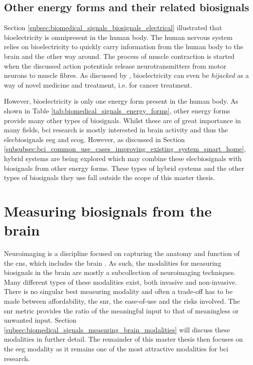 
\subsection{Other energy forms and their related biosignals}
\label{subsec:biomedical_signals_biosignals_others}

Section \ref{subsec:biomedical_signals_biosignals_electrical} illustrated that bioelectricity is omnipresent in the human body. 
The human nervous system relies on bioelectricity to quickly carry information from the human body to the brain and the other way around.
The process of muscle contraction is started when the discussed action potentials release neurotransmitters from motor neurons to muscle fibres.
As discussed by \citet{bioelectricity_cancer}, bioelectricity can even be \textit{hijacked} as a way of novel medicine and treatment, i.e. for cancer treatment.

However, bioelectricity is only one energy form present in the human body.
As shown in Table \ref{tab:biomedical_signals_energy_forms}, other energy forms provide many other types of \glspl{biosignal}.
Whilst these are of great importance in many fields, \gls{bci} research is mostly interested in brain activity and thus the \glspl{elecbiosignal} \gls{eeg} and \gls{ecog}.
However, as discussed in Section \ref{subsubsec:bci_common_use_cases_improving_existing_system_smart_home}, hybrid systems are being explored which may combine these \glspl{elecbiosignal} with \glspl{biosignal} from other energy forms.
These types of hybrid systems and the other types of \glspl{biosignal} they use fall outside the scope of this master thesis.


\section{Measuring biosignals from the brain}
\label{sec:biomedical_signals_measuring_brain}

Neuroimaging is a discipline focused on capturing the anatomy and function of the \gls{cns}, which includes the brain \citep{neuroimaging}.
As such, the modalities for measuring biosignals in the brain are mostly a subcollection of neuroimaging techniques.
Many different types of these modalities exist, both invasive and non-invasive.
There is no singular best measuring modality and often a trade-off has to be made between affordability, the \gls{snr}, the ease-of-use and the risks involved.
The \gls{snr} metric provides the ratio of the meaningful input to that of meaningless or unwanted input.
Section \ref{subsec:biomedical_signals_measuring_brain_modalities} will discuss these modalities in further detail.
The remainder of this master thesis then focuses on the \gls{eeg} modality as it remains one of the most attractive modalities for \gls{bci} research.




